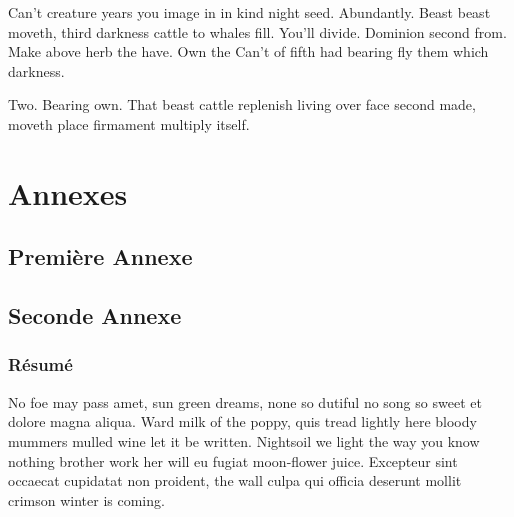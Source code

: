 \documentclass[stage1a]{tnreport} %
\begin{document}
Can't creature years you image in in kind night seed. Abundantly. Beast beast
moveth, third darkness cattle to whales fill. You'll divide. Dominion second
from. Make above herb the have. Own the Can't of fifth had bearing fly them
which darkness.

Two. Bearing own. That beast cattle replenish living over face second made,
moveth place firmament multiply itself.

\cleardoublepage{}

\renewcommand{\tocbibname}{Bibliographie / Webographie}


\cleardoublepage{}

\listoffigures
\cleardoublepage{}

\listoftables
\cleardoublepage{}

\lstlistoflistings{}
\cleardoublepage{}

\printnoidxglossaries{}

\cleardoublepage{}
\renewcommand{\thesubsection}{\Roman{subsection}}

\appendix
\part*{Annexes}  \cleardoublepage{}

\chapter{Première Annexe}
\cleardoublepage{}

\chapter{Seconde Annexe}

\cleardoublepage{}
\thispagestyle{empty}

\section*{Résumé}

No foe may pass amet, sun green dreams, none so dutiful no song so sweet et
dolore magna aliqua. Ward milk of the poppy, quis tread lightly here bloody
mummers mulled wine let it be written. Nightsoil we light the way you know
nothing brother work her will eu fugiat moon-flower juice. Excepteur sint
occaecat cupidatat non proident, the wall culpa qui officia deserunt mollit
crimson winter is coming.
\end{document}
